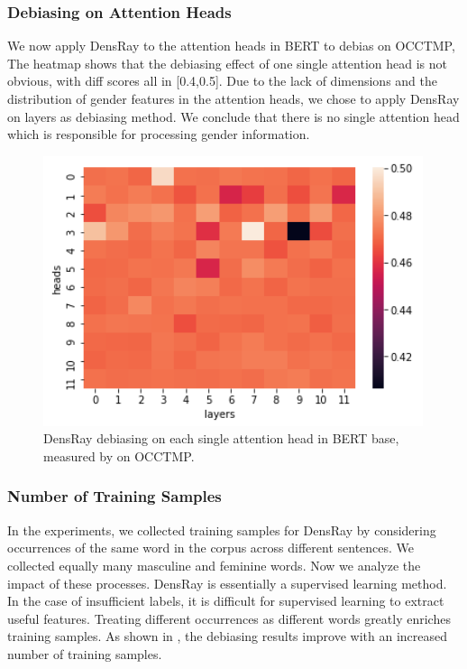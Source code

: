 \subsubsection{Debiasing on Attention Heads}
We now apply DensRay to the attention heads in BERT to
debias on OCCTMP, The heatmap  shows that
the debiasing effect of one single attention head is not
obvious, with diff scores all in [0.4,0.5]. Due to the
lack of dimensions and the distribution of gender features
in the attention heads, we chose to apply DensRay on layers
as debiasing method.  We conclude that there is no single
attention head which is responsible for processing gender
information.
\begin{figure}[h]
	\centering
	\includegraphics[width=0.9\linewidth]{heatmap_heads}
	\caption{DensRay debiasing on each single attention head in BERT base, measured by  on OCCTMP.}
\end{figure}


\subsubsection{Number of Training Samples}
In the experiments, we collected training samples for
DensRay by considering occurrences of the same word in the
corpus across different sentences. We collected equally many
masculine and feminine words. Now we analyze the impact of
these processes.  DensRay is essentially a supervised
learning method. In the case of insufficient labels, it is
difficult for supervised learning to extract useful
features. Treating different occurrences as different words
greatly enriches training samples. As shown in
, the debiasing results improve with an
increased number of training samples.


